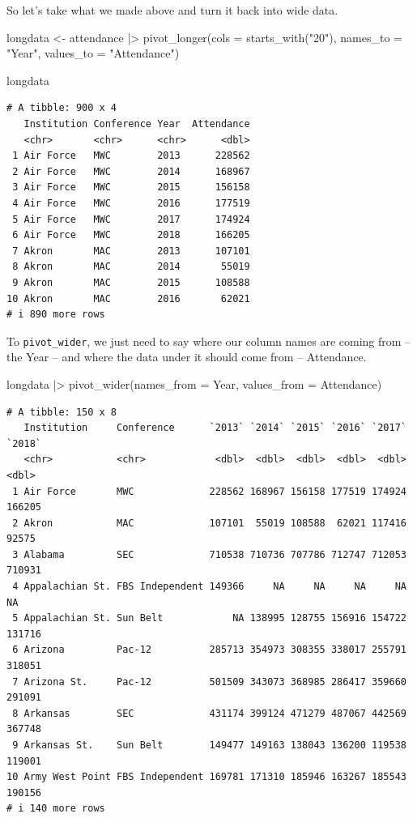 \documentclass[
  letterpaper,
  DIV=11,
  numbers=noendperiod]{scrreprt}
\newenvironment{Shaded}{\begin{snugshade}}{\end{snugshade}}
\newcommand{\AttributeTok}[1]{\textcolor[rgb]{0.40,0.45,0.13}{#1}}
\newcommand{\FunctionTok}[1]{\textcolor[rgb]{0.28,0.35,0.67}{#1}}
\newcommand{\NormalTok}[1]{\textcolor[rgb]{0.00,0.23,0.31}{#1}}
\newcommand{\OtherTok}[1]{\textcolor[rgb]{0.00,0.23,0.31}{#1}}
\newcommand{\SpecialCharTok}[1]{\textcolor[rgb]{0.37,0.37,0.37}{#1}}
\newcommand{\StringTok}[1]{\textcolor[rgb]{0.13,0.47,0.30}{#1}}
\begin{document}
So let's take what we made above and turn it back into wide data.

\begin{Shaded}
\begin{Highlighting}[]
\NormalTok{longdata }\OtherTok{\textless{}{-}}\NormalTok{ attendance }\SpecialCharTok{|\textgreater{}} \FunctionTok{pivot\_longer}\NormalTok{(}\AttributeTok{cols =} \FunctionTok{starts\_with}\NormalTok{(}\StringTok{"20"}\NormalTok{), }\AttributeTok{names\_to =} \StringTok{"Year"}\NormalTok{, }\AttributeTok{values\_to =} \StringTok{"Attendance"}\NormalTok{)}

\NormalTok{longdata}
\end{Highlighting}
\end{Shaded}

\begin{verbatim}
# A tibble: 900 x 4
   Institution Conference Year  Attendance
   <chr>       <chr>      <chr>      <dbl>
 1 Air Force   MWC        2013      228562
 2 Air Force   MWC        2014      168967
 3 Air Force   MWC        2015      156158
 4 Air Force   MWC        2016      177519
 5 Air Force   MWC        2017      174924
 6 Air Force   MWC        2018      166205
 7 Akron       MAC        2013      107101
 8 Akron       MAC        2014       55019
 9 Akron       MAC        2015      108588
10 Akron       MAC        2016       62021
# i 890 more rows
\end{verbatim}

To \texttt{pivot\_wider}, we just need to say where our column names are
coming from -- the Year -- and where the data under it should come from
-- Attendance.

\begin{Shaded}
\begin{Highlighting}[]
\NormalTok{longdata }\SpecialCharTok{|\textgreater{}} \FunctionTok{pivot\_wider}\NormalTok{(}\AttributeTok{names\_from =}\NormalTok{ Year, }\AttributeTok{values\_from =}\NormalTok{ Attendance)}
\end{Highlighting}
\end{Shaded}

\begin{verbatim}
# A tibble: 150 x 8
   Institution     Conference      `2013` `2014` `2015` `2016` `2017` `2018`
   <chr>           <chr>            <dbl>  <dbl>  <dbl>  <dbl>  <dbl>  <dbl>
 1 Air Force       MWC             228562 168967 156158 177519 174924 166205
 2 Akron           MAC             107101  55019 108588  62021 117416  92575
 3 Alabama         SEC             710538 710736 707786 712747 712053 710931
 4 Appalachian St. FBS Independent 149366     NA     NA     NA     NA     NA
 5 Appalachian St. Sun Belt            NA 138995 128755 156916 154722 131716
 6 Arizona         Pac-12          285713 354973 308355 338017 255791 318051
 7 Arizona St.     Pac-12          501509 343073 368985 286417 359660 291091
 8 Arkansas        SEC             431174 399124 471279 487067 442569 367748
 9 Arkansas St.    Sun Belt        149477 149163 138043 136200 119538 119001
10 Army West Point FBS Independent 169781 171310 185946 163267 185543 190156
# i 140 more rows
\end{verbatim}
\end{document}
